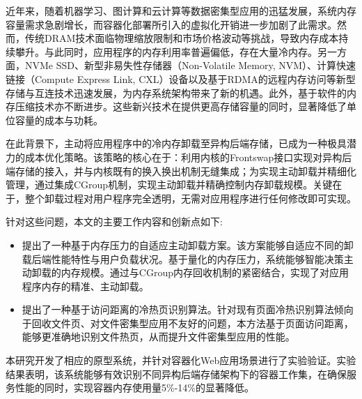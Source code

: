 	
\begin{chineseabstract}

近年来，随着机器学习、图计算和云计算等数据密集型应用的迅猛发展，系统内存容量需求急剧增长，而容器化部署所引入的虚拟化开销进一步加剧了此需求。然而，传统DRAM技术面临物理缩放限制和市场价格波动等挑战，导致内存成本持续攀升。与此同时，应用程序的内存利用率普遍偏低，存在大量冷内存。另一方面，NVMe SSD、新型非易失性存储器（Non-Volatile Memory, NVM）、计算快速链接（Compute Express Link, CXL）设备以及基于RDMA的远程内存访问等新型存储与互连技术迅速发展，为内存系统架构带来了新的机遇。此外，基于软件的内存压缩技术亦不断进步。这些新兴技术在提供更高存储容量的同时，显著降低了单位容量的成本与功耗。

在此背景下，主动将应用程序中的冷内存卸载至异构后端存储，已成为一种极具潜力的成本优化策略。该策略的核心在于：利用内核的Frontswap接口实现对异构后端存储的接入，并与内核既有的换入换出机制无缝集成；为实现主动卸载并精细化管理，通过集成CGroup机制，实现主动卸载并精确控制内存卸载规模。关键在于，整个卸载过程对用户程序完全透明，无需对应用程序进行任何修改即可实现。

针对这些问题，本文的主要工作内容和创新点如下:
\begin{itemize}
    \item 提出了一种基于内存压力的自适应主动卸载方案。该方案能够自适应不同的卸载后端性能特性与用户负载状况。基于量化的内存压力，系统能够智能决策主动卸载的内存规模。通过与CGroup内存回收机制的紧密结合，实现了对应用程序内存的精准、主动卸载。
    \item 提出了一种基于访问距离的冷热页识别算法。针对现有页面冷热识别算法倾向于回收文件页、对文件密集型应用不友好的问题，本方法基于页面访问距离，能够更准确地识别文件热页，从而提升文件密集型应用的性能。
\end{itemize}

本研究开发了相应的原型系统，并针对容器化Web应用场景进行了实验验证。实验结果表明，该系统能够有效识别不同异构后端存储架构下的容器工作集，在确保服务性能的同时，实现容器内存使用量5\%-14\%的显著降低。

\end{chineseabstract}